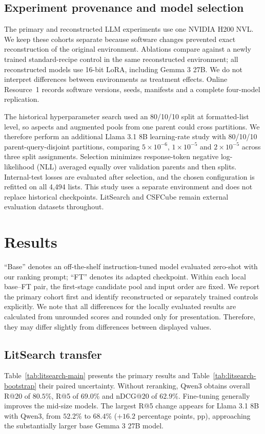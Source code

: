 \documentclass[pdflatex,sn-basic,Numbered]{sn-jnl}%
\theoremstyle{thmstyleone}%
\theoremstyle{thmstyletwo}%
\theoremstyle{thmstylethree}%
\begin{document}
\subsection{Experiment provenance and model selection}
\label{sec:reproducibility}
The primary and reconstructed LLM experiments use one NVIDIA H200 NVL. We keep
these cohorts separate because software changes prevented exact reconstruction
of the original environment. Ablations compare against a newly trained
standard-recipe control in the same reconstructed environment; all reconstructed
models use 16-bit LoRA, including Gemma 3 27B. We do not interpret differences
between environments as treatment effects. Online Resource~1 records software
versions, seeds, manifests and a complete four-model replication.

The historical hyperparameter search used an 80/10/10 split at formatted-list
level, so aspects and augmented pools from one parent could cross partitions.
We therefore perform an additional Llama 3.1 8B learning-rate study with
80/10/10 parent-query-disjoint partitions, comparing $5\times10^{-6}$,
$1\times10^{-5}$ and $2\times10^{-5}$ across three split assignments. Selection
minimizes response-token negative log-likelihood (NLL) averaged equally over validation
parents and then splits. Internal-test losses are evaluated after selection, and
the chosen configuration is refitted on all 4,494 lists. This study uses a
separate environment and does not replace historical checkpoints. LitSearch
and CSFCube remain external evaluation datasets throughout.

\section{Results}
\label{sec:results}
``Base'' denotes an off-the-shelf instruction-tuned model evaluated zero-shot
with our ranking prompt; ``FT'' denotes its adapted checkpoint. Within each
local base--FT pair, the first-stage candidate pool and input order are fixed.
We report the primary cohort first and identify reconstructed or separately
trained controls explicitly.
We note that all differences for the locally evaluated results are calculated from unrounded
scores and rounded only for presentation. Therefore, they may differ slightly
from differences between displayed values.

\subsection{LitSearch transfer}
Table~\ref{tab:litsearch-main} presents the primary results and
Table~\ref{tab:litsearch-bootstrap} their paired uncertainty. Without reranking,
Qwen3 obtains overall R@20 of $80.5\%$, R@5 of $69.0\%$ and nDCG@20 of
$62.9\%$. Fine-tuning generally improves the mid-size models. The largest
R@5 change appears for Llama 3.1 8B with Qwen3, from $52.2\%$ to $68.4\%$
($+16.2$ percentage points, pp), approaching the substantially larger base Gemma 3 27B model.
\end{document}
